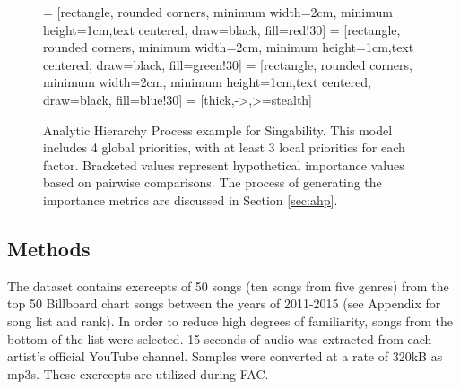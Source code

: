 \begin{figure*}
 = [rectangle, rounded corners, minimum width=2cm, minimum height=1cm,text centered, draw=black, fill=red!30]
 = [rectangle, rounded corners, minimum width=2cm, minimum height=1cm,text centered, draw=black, fill=green!30]
 = [rectangle, rounded corners, minimum width=2cm, minimum height=1cm,text centered, draw=black, fill=blue!30]
 = [thick,->,>=stealth]
\centering
{}
\caption{Analytic Hierarchy Process example for Singability. This model includes 4 global priorities, with at least 3 local priorities for each factor. Bracketed values represent hypothetical importance values based on pairwise comparisons. The process of generating the importance metrics are discussed in Section \ref{sec:ahp}. \label{fig:ahpExample}}
\end{figure*}

\subsection{Methods}
The dataset contains exercepts of 50 songs (ten songs from five genres) from the top 50 Billboard chart songs between the years of 2011-2015 (see Appendix for song list and rank). In order to reduce high degrees of familiarity, songs from the bottom of the list were selected. 15-seconds of audio was extracted from each artist's official YouTube channel. Samples were converted at a rate of 320kB as mp3s. These exercepts are utilized during FAC.

